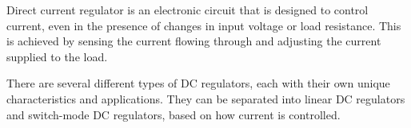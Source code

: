 Direct current regulator is an electronic circuit that is designed to control  current, even in the presence of changes in input voltage or load resistance. This is achieved by sensing the current flowing through and adjusting the current supplied to the load.

There are several different types of DC regulators, each with their own unique characteristics and applications. They can be separated into linear DC regulators and switch-mode DC regulators, based on how current is controlled.


\begin{comment}
potentiaal sources

https://www.monolithicpower.com/en/voltage-regulator-types
https://www.rohm.com/electronics-basics/dc-dc-converters/linear-vs-switching-regulators
https://en.wikipedia.org/wiki/Pulse-width_modulation#Power_delivery
https://en.wikipedia.org/wiki/Chopper_(electronics)

"Power Electronics: Converters, Applications, and Design" by Ned Mohan, Tore M. Undeland, William P. Robbins.
"Power Electronics Handbook" Edited by Muhammad H. Rashid
"Control of Electric Motors" by William W. Stacey.

\end{comment}